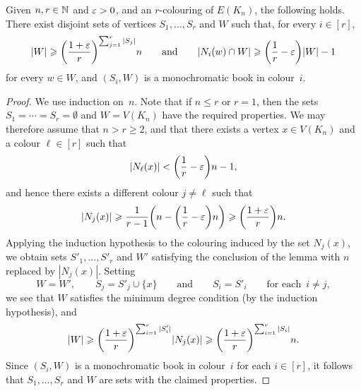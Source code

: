 \begin{lemma}
  \label{lem:ESz:steps} %
  Given \(n,r \in \mathbb{N}\) and \(\varepsilon > 0\), and an \(r\)-colouring of \(E(K_n)\), the following holds. There exist disjoint sets of vertices \(S_1,\dots,S_r\) and \(W\) such that, for every \(i \in [r]\), 
  \begin{equation*}
    |W| \geqslant \bigg( \frac{1+\varepsilon}{r} \bigg)^{\sum_{j = 1}^r |S_j|} n \qquad \text{and} \qquad |N_i(w) \cap W| \geqslant \bigg( \frac{1}{r} - \varepsilon \bigg) |W| - 1
  \end{equation*}
  for every \(w \in W\), and \((S_i,W)\) is a monochromatic book in colour~\(i\).
\end{lemma}
%
\begin{proof}
  We use induction on~\(n\). Note that if \(n \le r\) or \(r = 1\), then the sets \(S_1 = \cdots = S_r = \emptyset\) and \(W = V(K_n)\) have the required properties. We may therefore assume that \(n > r \ge 2\), and that there exists a vertex \(x \in V(K_n)\) and a colour \(\ell \in [r]\) such that
  \begin{equation*}
    |N_\ell(x)| < \bigg( \frac{1}{r} - \varepsilon \bigg) n - 1,
  \end{equation*}
  and hence there exists a different colour \(j \ne \ell\) such that 
  \begin{equation*}
    |N_j(x)| \geqslant \frac{1}{r-1} \bigg( n - \bigg( \frac{1}{r} - \varepsilon \bigg) n \bigg) \geqslant \bigg( \frac{1 + \varepsilon}{r} \bigg) n.
  \end{equation*}
  Applying the induction hypothesis to the colouring induced by the set \(N_j(x)\), we obtain sets \(S'_1,\ldots,S'_r\) and \(W'\) satisfying the conclusion of the lemma with \(n\) replaced by \(|N_j(x)|\). Setting 
  \begin{equation*}
    W = W', \qquad S_j = S'_j \cup \{x\} \qquad \text{and} \qquad S_i = S'_i \qquad \text{for each } \, i \ne j,
  \end{equation*}
  we see that \(W\) satisfies the minimum degree condition (by the induction hypothesis), and
  \begin{equation*}
    |W| \geqslant \bigg( \frac{1+\varepsilon}{r} \bigg)^{\sum_{i = 1}^r |S'_i|}|N_j(x)| \geqslant \bigg( \frac{1+\varepsilon}{r} \bigg)^{\sum_{i=1}^r |S_i|}n.
  \end{equation*}
  Since \((S_i,W)\) is a monochromatic book in colour~\(i\) for each \(i \in [r]\), it follows that \(S_1,\dots,S_r\) and \(W\) are sets with the claimed properties.
\end{proof}

